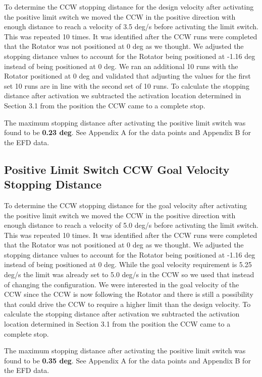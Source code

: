 \documentclass[SE,lsstdraft,authoryear,toc]{lsstdoc}
\begin{document}
To determine the CCW stopping distance for the design velocity after
activating the positive limit switch we moved the CCW in the positive
direction with enough distance to reach a velocity of 3.5 deg/s before
activating the limit switch. This was repeated 10 times. It was
identified after the CCW runs were completed that the Rotator was not
positioned at 0 deg as we thought. We adjusted the stopping distance
values to account for the Rotator being positioned at -1.16 deg instead
of being positioned at 0 deg. We ran an additional 10 runs with the
Rotator positioned at 0 deg and validated that adjusting the values for
the first set 10 runs are in line with the second set of 10 runs. To
calculate the stopping distance after activation we subtracted the
activation location determined in Section 3.1 from the position the CCW
came to a complete stop.

The maximum stopping distance after activating the positive limit switch
was found to be \textbf{0.23 deg}. See Appendix A for the data points
and Appendix B for the EFD data.

\subsection{Positive Limit Switch CCW Goal Velocity Stopping Distance}

To determine the CCW stopping distance for the goal velocity after
activating the positive limit switch we moved the CCW in the positive
direction with enough distance to reach a velocity of 5.0 deg/s before
activating the limit switch. This was repeated 10 times. It was
identified after the CCW runs were completed that the Rotator was not
positioned at 0 deg as we thought. We adjusted the stopping distance
values to account for the Rotator being positioned at -1.16 deg instead
of being positioned at 0 deg. While the goal velocity requirement is
5.25 deg/s the limit was already set to 5.0 deg/s in the CCW so we used
that instead of changing the configuration. We were interested in the
goal velocity of the CCW since the CCW is now following the Rotator and
there is still a possibility that could drive the CCW to require a
higher limit than the design velocity. To calculate the stopping
distance after activation we subtracted the activation location
determined in Section 3.1 from the position the CCW came to a complete
stop.

The maximum stopping distance after activating the positive limit switch
was found to be \textbf{0.35 deg}. See Appendix A for the data points
and Appendix B for the EFD data.
\end{document}
